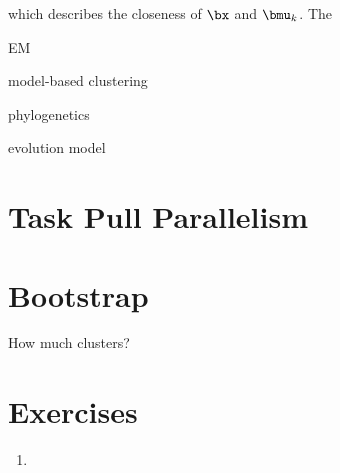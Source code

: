 which describes the closeness of $\bx$ and $\bmu_k$.
The 

EM

model-based clustering

phylogenetics

evolution model




\section{Task Pull Parallelism}




\section{Bootstrap}

How much clusters?




\section{Exercises}
\label{sec:phyclust_exercise}

\begin{enumerate}[label=\thechapter-\arabic*]

\item


\end{enumerate}

